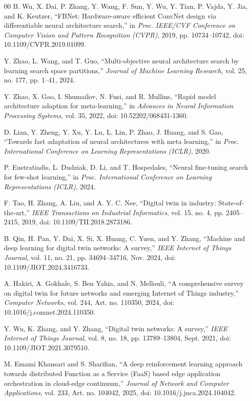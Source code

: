 \documentclass[a4paper,fleqn]{cas-sc}
\begin{document}
\begin{thebibliography}{00}
 B. Wu, X. Dai, P. Zhang, Y. Wang, F. Sun, Y. Wu, Y. Tian, P. Vajda, Y. Jia, and K. Keutzer, ``FBNet: Hardware-aware efficient ConvNet design via differentiable neural architecture search,'' in \emph{Proc. IEEE/CVF Conference on Computer Vision and Pattern Recognition (CVPR)}, 2019, pp. 10734--10742, doi: 10.1109/CVPR.2019.01099.

 Y. Zhao, L. Wang, and T. Guo, ``Multi-objective neural architecture search by learning search space partitions,'' \emph{Journal of Machine Learning Research}, vol. 25, no. 177, pp. 1--41, 2024.

Y. Zhao, X. Gao, I. Shumailov, N. Fusi, and R. Mullins,
``Rapid model architecture adaption for meta-learning,''
in \emph{Advances in Neural Information Processing Systems},
vol. 35, 2022,
doi: 10.52202/068431-1360.

D. Lian, Y. Zheng, Y. Xu, Y. Lu, L. Lin, P. Zhao, J. Huang, and S. Gao,
``Towards fast adaptation of neural architectures with meta learning,''
in \emph{Proc. International Conference on Learning Representations
(ICLR)}, 2020.

P. Eustratiadis, L. Dudziak, D. Li, and T. Hospedales,
``Neural fine-tuning search for few-shot learning,''
in \emph{Proc. International Conference on Learning Representations
(ICLR)}, 2024.


 F. Tao, H. Zhang, A. Liu, and A. Y. C. Nee, ``Digital twin in industry: State-of-the-art,'' \emph{IEEE Transactions on Industrial Informatics}, vol. 15, no. 4, pp. 2405--2415, 2019, doi: 10.1109/TII.2018.2873186.

 B. Qin, H. Pan, Y. Dai, X. Si, X. Huang, C. Yuen, and Y. Zhang, ``Machine and deep learning for digital twin networks: A survey,'' \emph{IEEE Internet of Things Journal}, vol. 11, no. 21, pp. 34694--34716, Nov. 2024, doi: 10.1109/JIOT.2024.3416733.

 A. Hakiri, A. Gokhale, S. Ben Yahia, and N. Mellouli, ``A comprehensive survey on digital twin for future networks and emerging Internet of Things industry,'' \emph{Computer Networks}, vol. 244, Art. no. 110350, 2024, doi: 10.1016/j.comnet.2024.110350.

 Y. Wu, K. Zhang, and Y. Zhang, ``Digital twin networks: A survey,'' \emph{IEEE Internet of Things Journal}, vol. 8, no. 18, pp. 13789--13804, Sept. 2021, doi: 10.1109/JIOT.2021.3079510.

M. Emami Khansari and S. Sharifian,
``A deep reinforcement learning approach towards distributed Function as a
Service (FaaS) based edge application orchestration in cloud-edge
continuum,''
\emph{Journal of Network and Computer Applications}, vol. 233,
Art. no. 104042, 2025,
doi: 10.1016/j.jnca.2024.104042.


\end{thebibliography}
\end{document}
